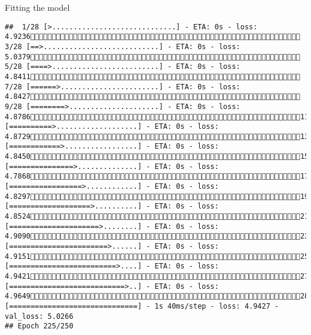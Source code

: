 \documentclass[
  ignorenonframetext,
]{beamer}
\begin{document}
\begin{frame}[fragile]{Fitting the model}
\begin{verbatim}
##  1/28 [>.............................] - ETA: 0s - loss: 4.9236 3/28 [==>...........................] - ETA: 0s - loss: 5.0379 5/28 [====>.........................] - ETA: 0s - loss: 4.8411 7/28 [======>.......................] - ETA: 0s - loss: 4.8427 9/28 [========>.....................] - ETA: 0s - loss: 4.878611/28 [==========>...................] - ETA: 0s - loss: 4.872913/28 [============>.................] - ETA: 0s - loss: 4.845015/28 [===============>..............] - ETA: 0s - loss: 4.786817/28 [=================>............] - ETA: 0s - loss: 4.829719/28 [===================>..........] - ETA: 0s - loss: 4.852421/28 [=====================>........] - ETA: 0s - loss: 4.909023/28 [=======================>......] - ETA: 0s - loss: 4.915125/28 [=========================>....] - ETA: 0s - loss: 4.942127/28 [===========================>..] - ETA: 0s - loss: 4.964928/28 [==============================] - 1s 40ms/step - loss: 4.9427 - val_loss: 5.0266
## Epoch 225/250

\end{verbatim}
\end{frame}
\end{document}
